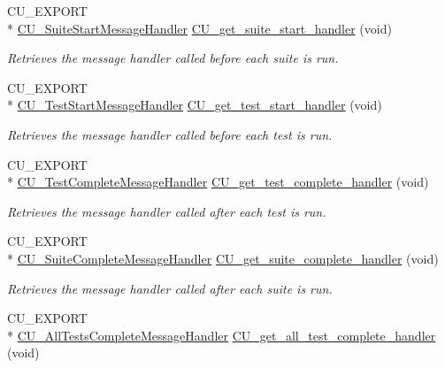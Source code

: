 \begin{DoxyCompactItemize}
C\-U\-\_\-\-E\-X\-P\-O\-R\-T \\*
\hyperlink{group__Framework_gab7f4df4360e8d2faa7e59571a1409448}{C\-U\-\_\-\-Suite\-Start\-Message\-Handler} \hyperlink{group__Framework_ga4403d186236201362d04069c9565a777}{C\-U\-\_\-get\-\_\-suite\-\_\-start\-\_\-handler} (void)
\begin{DoxyCompactList}\small\item\em Retrieves the message handler called before each suite is run. \end{DoxyCompactList}\item 
C\-U\-\_\-\-E\-X\-P\-O\-R\-T \\*
\hyperlink{group__Framework_ga3330df7f5c95933f4ba21c648933c928}{C\-U\-\_\-\-Test\-Start\-Message\-Handler} \hyperlink{group__Framework_gaa68ed834a6a3c4b1bfd5beaa9b40a735}{C\-U\-\_\-get\-\_\-test\-\_\-start\-\_\-handler} (void)
\begin{DoxyCompactList}\small\item\em Retrieves the message handler called before each test is run. \end{DoxyCompactList}\item 
C\-U\-\_\-\-E\-X\-P\-O\-R\-T \\*
\hyperlink{group__Framework_ga2c11da75531b097ca037223489bf02be}{C\-U\-\_\-\-Test\-Complete\-Message\-Handler} \hyperlink{group__Framework_ga98c5d999807279aa1960cbd2b3645f82}{C\-U\-\_\-get\-\_\-test\-\_\-complete\-\_\-handler} (void)
\begin{DoxyCompactList}\small\item\em Retrieves the message handler called after each test is run. \end{DoxyCompactList}\item 
C\-U\-\_\-\-E\-X\-P\-O\-R\-T \\*
\hyperlink{group__Framework_gafe19dbdf8b13029d10e9463bc698be58}{C\-U\-\_\-\-Suite\-Complete\-Message\-Handler} \hyperlink{group__Framework_gabbc23abadd2c3e2e8fd9edf723d9870d}{C\-U\-\_\-get\-\_\-suite\-\_\-complete\-\_\-handler} (void)
\begin{DoxyCompactList}\small\item\em Retrieves the message handler called after each suite is run. \end{DoxyCompactList}\item 
C\-U\-\_\-\-E\-X\-P\-O\-R\-T \\*
\hyperlink{group__Framework_ga5c8cffc5ce2801990436b3e6992bf770}{C\-U\-\_\-\-All\-Tests\-Complete\-Message\-Handler} \hyperlink{group__Framework_gaaa8c23572f049b78a48eaad6add84f5a}{C\-U\-\_\-get\-\_\-all\-\_\-test\-\_\-complete\-\_\-handler} (void)

\end{DoxyCompactItemize}
